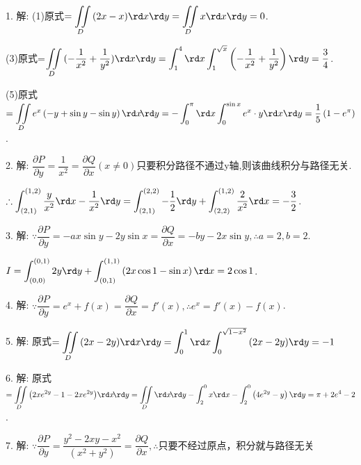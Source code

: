   1. 解: (1)原式$ = \displaystyle\iint\limits _D {(2x - x)\rd x\rd y} = \iint\limits _D {x\rd x\rd y = 0}$.

  (3)原式=$ \displaystyle\iint\limits _D {( - \dfrac{1}{{{x^2}}}} + \dfrac{1}{{{y^2}}})\rd x\rd y = \displaystyle\int _1^4 {\rd x\displaystyle\int _1^{\sqrt x } {\left( { - \dfrac{1}{{{x^2}}} + \dfrac{1}{{{y^2}}}} \right)\rd y} }  = \dfrac{3}{4}$.

  (5)原式$  = \displaystyle\iint\limits _D {{e^x}}\left( { - y + \sin y - \sin y} \right)\rd x \! \rd y =  - \displaystyle\int _0^\pi  {\rd x} \displaystyle\int _0^{\sin x} {{e^x} \cdot y\rd x\rd y = \dfrac{1}{5}} \left( {1 - {e^\pi }} \right) $.

  2. 解: $\dfrac{{\partial P}}{{\partial y}} = \dfrac{1}{{{x^2}}} =    \dfrac{{\partial Q}}{{\partial x}}\left( {x \ne 0} \right)$只要积分路径不通过y轴,则该曲线积分与路径无关.

  $\therefore \displaystyle\int _{\left( {2,1} \right)}^{\left( {1,2} \right)} {\dfrac{y}{{{x^2}}}} \rd x - \dfrac{1}{{{x^2}}}\rd y = \displaystyle\int _{\left( {2,1} \right)}^{\left( {2,2} \right)} { - \dfrac{1}{2}} \rd y + \displaystyle\int _{\left( {2,2} \right)}^{\left( {1,2} \right)} {\dfrac{2}{{{x^2}}}} \rd x =  - \dfrac{3}{2}$.

  3. 解: $\because \dfrac{{\partial P}}{{\partial y}} =  - ax\sin y - 2y\sin x = \dfrac{{\partial Q}}{{\partial x}} =  - by - 2x\sin y,\therefore a = 2,b = 2$.

  $I = \displaystyle\int _{\left( {0,0} \right)}^{\left( {0,1} \right)} {2y\rd y + \displaystyle\int _{\left( {0,1} \right)}^{\left( {1,1} \right)} {\left( {2x\cos 1 - \sin x} \right)\rd x = 2\cos 1} } $.

  4. 解: $\because \dfrac{{\partial P}}{{\partial y}} = {e^x} + f\left( x \right) = \dfrac{{\partial Q}}{{\partial x}} = f'\left( x \right),\therefore {e^x} = f'\left( x \right) - f\left( x \right)  $.

  5. 解: 原式$ = \displaystyle\iint\limits _D {\left( {2x - 2y} \right)}\rd x\rd y = \displaystyle\int _0^1 {\rd x} \displaystyle\int _0^{\sqrt {1 - {x^2}} } {\left( {2x - 2y} \right)} \rd y =  - 1$

  6. 解: 原式$ = \displaystyle\iint\limits _D {\left( {2x{e^{2y}} - 1 - 2x{e^{2y}}} \right)}\rd x \! \rd y = \iint\limits _D {\rd x \! \rd y -  {\displaystyle\int _2^0 {x\rd x} } } -  {\displaystyle\int _2^0 {\left( {4{e^{2y}} - y} \right)\rd y} } = \pi  + 2{e^4} - 2$.

  7. 解: $ \because \dfrac{\partial P}{\partial y}=\dfrac{{{y}^{2}}-2xy-{{x}^{2}}}{\left( {{x}^{2}}+{{y}^{2}} \right)}=\dfrac{\partial Q}{\partial x},\therefore $只要不经过原点，积分就与路径无关

